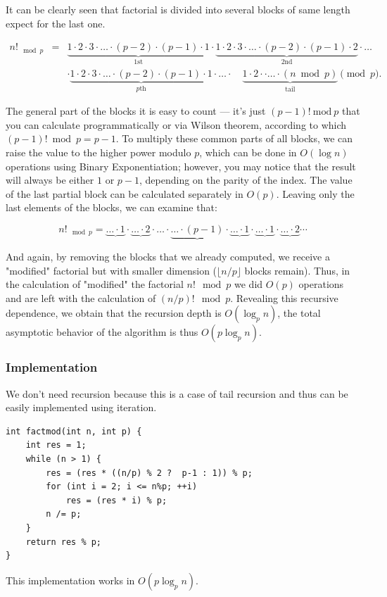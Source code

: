 \documentclass[8pt, a4paper, oneside, twocolumn]{extarticle}
\begin{document}
It can be clearly seen that factorial is divided into several blocks of same length expect for the last one.

\noindent\begin{eqnarray} n!_{\mod p}&=& \underbrace{1 \cdot 2 \cdot 3 \cdot \ldots \cdot (p-2) \cdot (p-1) \cdot 1}_{1\text{st}} \cdot \underbrace{1 \cdot 2 \cdot 3 \cdot \ldots \cdot (p-2) \cdot (p-1) \cdot 2}_{2\text{nd}} \cdot \ldots \\ & & \cdot \underbrace{1 \cdot 2 \cdot 3 \cdot \ldots \cdot (p-2) \cdot (p-1) \cdot 1}_{p\text{th}} \cdot \ldots \cdot \quad \underbrace{1 \cdot 2 \cdot \cdot \ldots \cdot (n \bmod p)}_{\text{tail}} \pmod{p}. \end{eqnarray}

The general part of the blocks it is easy to count — it's just $(p-1)!\ \mathrm{mod}\ p$ that you can calculate programmatically or via Wilson theorem, according to which $(p-1)! \bmod p = p-1$. To multiply these common parts of all blocks, we can raise the value to the higher power modulo $p$, which can be done in $O(\log n)$ operations using Binary Exponentiation; however, you may notice that the result will always be either $1$ or $p-1$, depending on the parity of the index. The value of the last partial block can be calculated separately in $O(p)$. Leaving only the last elements of the blocks, we can examine that:

\noindent$$n!_{\mod p} = \underbrace{ \ldots \cdot 1 } \cdot \underbrace{ \ldots \cdot 2} \cdot \ldots \cdot \underbrace{ \ldots \cdot (p-1)} \cdot \underbrace{ \ldots \cdot 1 } \cdot \underbrace{ \ldots \cdot 1} \cdot \underbrace{ \ldots \cdot 2} \cdots$$

And again, by removing the blocks that we already computed, we receive a "modified" factorial but with smaller dimension ($\lfloor n / p \rfloor$ blocks remain). Thus, in the calculation of "modified" the factorial $n!{\mod p}$ we did $O(p)$ operations and are left with the calculation of $(n/p)!{\mod p}$. Revealing this recursive dependence, we obtain that the recursion depth is $O(\log_p n)$, the total asymptotic behavior of the algorithm is thus $O(p \log_p n)$.
\subsubsection{Implementation}
We don't need recursion because this is a case of tail recursion and thus can be easily implemented using iteration.
\begin{verbatim}
int factmod(int n, int p) {
	int res = 1;
	while (n > 1) {
		res = (res * ((n/p) % 2 ?  p-1 : 1)) % p;
		for (int i = 2; i <= n%p; ++i)
			res = (res * i) % p;
		n /= p;
	}
	return res % p;
}
\end{verbatim}
This implementation works in $O(p \log_p n)$.
\end{document}
